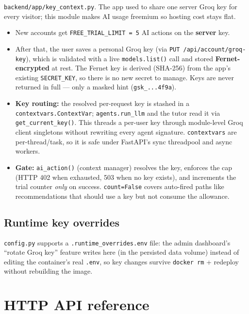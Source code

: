 \documentclass[11pt,a4paper]{article}
\newcommand{\code}[1]{\colorbox{fbCream}{\texttt{\small #1}}}
\begin{document}
\code{backend/app/key\_context.py}. The app used to share one server Groq key for
every visitor; this module makes AI usage freemium so hosting cost stays flat.

\begin{itemize}[leftmargin=1.4em]
\item New accounts get \code{FREE\_TRIAL\_LIMIT = 5} AI actions on the
  \textbf{server} key.
\item After that, the user saves a personal Groq key (via
  \code{PUT /api/account/groq-key}), which is validated with a live
  \code{models.list()} call and stored \textbf{Fernet-encrypted} at rest. The
  Fernet key is derived (SHA-256) from the app's existing \code{SECRET\_KEY}, so
  there is no new secret to manage. Keys are never returned in full --- only a
  masked hint (\code{gsk\_...4f9a}).
\item \textbf{Key routing:} the resolved per-request key is stashed in a
  \code{contextvars.ContextVar}; \code{agents.run\_llm} and the tutor read it via
  \code{get\_current\_key()}. This threads a per-user key through module-level Groq
  client singletons without rewriting every agent signature. \code{contextvars}
  are per-thread/task, so it is safe under FastAPI's sync threadpool and async
  workers.
\item \textbf{Gate:} \code{ai\_action()} (context manager) resolves the key,
  enforces the cap (HTTP 402 when exhausted, 503 when no key exists), and
  increments the trial counter \emph{only} on success. \code{count=False} covers
  auto-fired paths like recommendations that should use a key but not consume the
  allowance.
\end{itemize}

\subsection{Runtime key overrides}

\code{config.py} supports a \code{.runtime\_overrides.env} file: the admin
dashboard's ``rotate Groq key'' feature writes here (in the persisted data volume)
instead of editing the container's real \code{.env}, so key changes survive
\code{docker rm} + redeploy without rebuilding the image.

\section{HTTP API reference}
\end{document}
